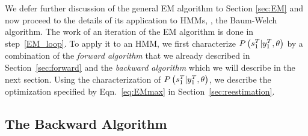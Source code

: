 We defer further discussion of the general EM algorithm to Section
\ref{sec:EM} and now proceed to the details of its application to
HMMs, \ie, the Baum-Welch algorithm.  The work of an iteration of the
EM algorithm is done in step~\ref{EM_loop}.  To apply it to an HMM, we
first characterize $P \left(s_{1}^{T}|y_{1}^{T}, \theta
\right)$ by a combination of the \emph{forward algorithm} that we
already described in Section~\ref{sec:forward} and the \emph{backward
  algorithm} which we will describe in the next section.  Using the
characterization of $P \left(s_{1}^{T}|y_{1}^{T}, \theta
\right)$, we describe the optimization specified by
Eqn.~\eqref{eq:EMmax} in Section~\ref{sec:reestimation}.

\subsection{The Backward Algorithm}
\label{sec:backward}

